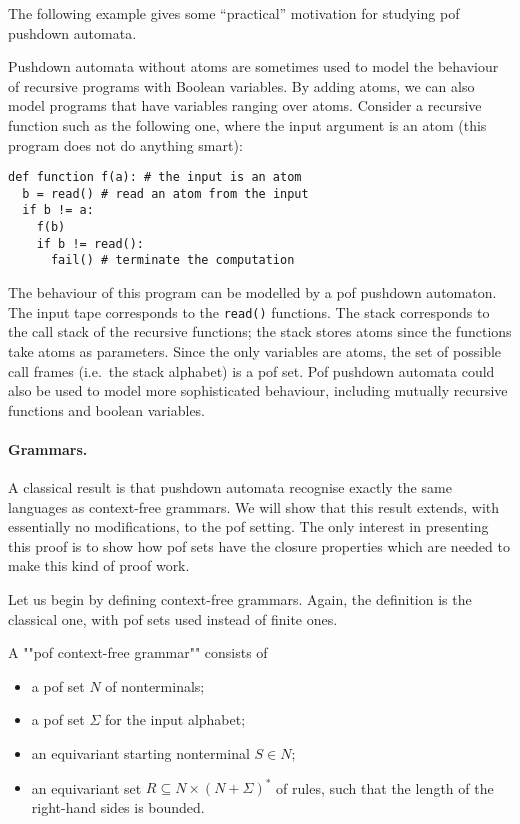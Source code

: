 	The following example gives some ``practical'' motivation for studying pof pushdown automata.
		\begin{myexample} \label{example:model-recursive-programs}
		Pushdown automata without atoms are sometimes used to model the behaviour of recursive  programs with Boolean variables. By adding atoms,  
	we can also model programs that have variables ranging over atoms. 	Consider  a recursive function such as the following one, where the input argument is an atom (this program does not do anything smart):





\begin{lstlisting}
def function f(a): # the input is an atom
  b = read() # read an atom from the input
  if b != a:
    f(b)
    if b != read():
	  fail() # terminate the computation
\end{lstlisting}
	The behaviour of this program can be modelled by a pof pushdown automaton. The input tape corresponds to the {\tt read()} functions. The stack corresponds to the call stack of the recursive functions; the stack stores atoms since the functions take atoms as parameters. Since the only variables are atoms, the set of possible call frames (i.e.~the stack alphabet) is a pof set. Pof 
 pushdown automata could also be used to model more sophisticated behaviour, including mutually recursive functions and boolean variables. 
	\end{myexample}


\paragraph*{Grammars.} A classical result is that pushdown automata recognise exactly the same languages as context-free grammars. We will show that this result extends, with essentially no modifications, to the pof setting. The only interest in presenting this proof is to show how pof sets have the closure properties which are needed to make this kind of proof work.

Let us begin by defining context-free grammars. Again, the definition is the classical one, with pof sets used instead of finite ones. 
\begin{definition}
	\label{def:pof-grammar}
	A ""pof context-free grammar"" consists of 
	\begin{itemize}
		\item a pof set $N$ of nonterminals;
		\item a pof set $\Sigma$ for the input alphabet;
		\item an equivariant starting nonterminal $S \in N$;
		\item an equivariant set $R \subseteq N \times (N + \Sigma)^*$ of rules, such that the length of the right-hand sides is bounded.
	\end{itemize}
\end{definition}

